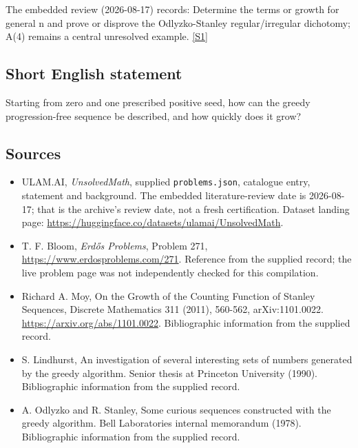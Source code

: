 \documentclass[11pt,a4paper]{article}
\newcommand{\sref}[2]{\hyperlink{source:#1:#2}{[S#2]}}
\begin{document}
The embedded review (2026-08-17) records: Determine the terms or growth for general n and prove or disprove the Odlyzko-Stanley regular/irregular dichotomy; A(4) remains a central unresolved example. \sref{statement}{1}

\subsection{Short English statement}

Starting from zero and one prescribed positive seed, how can the greedy progression-free sequence be described, and how quickly does it grow?

\subsection{Sources}

{\small

\begin{itemize}

\item[\hypertarget{source:statement:1}{S1}] ULAM.AI, \emph{UnsolvedMath}, supplied \texttt{problems.json}, catalogue entry, statement and background. The embedded literature-review date is 2026-08-17; that is the archive’s review date, not a fresh certification. Dataset landing page: \url{https://huggingface.co/datasets/ulamai/UnsolvedMath}.

\item[\hypertarget{source:statement:2}{S2}] T. F. Bloom, \emph{Erdős Problems}, Problem 271, \url{https://www.erdosproblems.com/271}. Reference from the supplied record; the live problem page was not independently checked for this compilation.

\item[\hypertarget{source:statement:3}{S3}] Richard A. Moy, On the Growth of the Counting Function of Stanley Sequences, Discrete Mathematics 311 (2011), 560-562, arXiv:1101.0022. \url{https://arxiv.org/abs/1101.0022}. Bibliographic information from the supplied record.

\item[\hypertarget{source:statement:4}{S4}] S. Lindhurst, An investigation of several interesting sets of numbers generated by the greedy algorithm. Senior thesis at Princeton University (1990). Bibliographic information from the supplied record.

\item[\hypertarget{source:statement:5}{S5}] A. Odlyzko and R. Stanley, Some curious sequences constructed with the greedy algorithm. Bell Laboratories internal memorandum (1978). Bibliographic information from the supplied record.

\end{itemize}

}

\label{end:statement}
\end{document}
